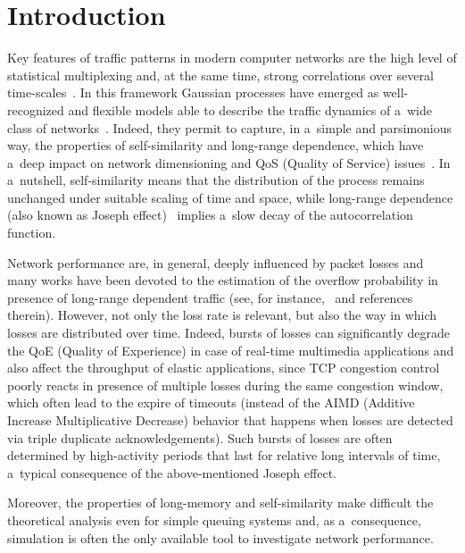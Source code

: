       \begin{multicols}{2}

                  \label{st\stat}


\section{Introduction}

\noindent
Key features of traffic patterns in modern computer networks are the high level 
of statistical multiplexing and, at the same time, strong correlations over several 
time-scales~\cite{Leland}. In this framework Gaussian processes have emerged as 
well-recognized and flexible models able to describe the traffic dynamics of 
a~wide class of networks~\cite{norrosJSAC, Mandjes-book}. Indeed, they permit 
to capture, in a~simple and parsimonious way, the properties of self-similarity 
and long-range dependence, which have a~deep impact on network dimensioning and
 QoS (Quality of Service) issues~\cite{Erramilli}.
In a~nutshell, self-similarity means that the distribution of the process
 remains unchanged under suitable scaling of time and space, while
long-range dependence (also known as Joseph effect)~\cite{Samorodnitsky} 
implies a~slow decay of the autocorrelation function.

Network performance are, in general, deeply influenced by packet losses and many 
works have been devoted to the estimation of the overflow probability in presence 
of long-range dependent traffic (see, for instance,~\cite{Mandjes-book} and references
 therein). However, not only the loss rate is relevant, but also the way in which 
 losses are distributed over time. Indeed, bursts of losses can significantly degrade 
 the QoE (Quality of Experience) in case of real-time multimedia applications 
 and also affect the throughput of elastic applications, since TCP congestion 
 control~\cite{rfc5681} poorly reacts in presence of multiple losses during 
 the same congestion window, which often lead to the expire of timeouts 
 (instead of the AIMD (Additive Increase Multiplicative Decrease) behavior 
 that happens when losses are detected via triple duplicate acknowledgements). 
 Such bursts of losses are often determined by high-activity periods that last 
 for relative long intervals of time, a~typical consequence of the above-mentioned 
 Joseph effect.

Moreover, the properties of long-memory and self-similarity make difficult 
the theoretical analysis even for simple queuing systems and, as a~consequence, 
simulation is often the only available tool to investigate network performance. 


\end{multicols}
